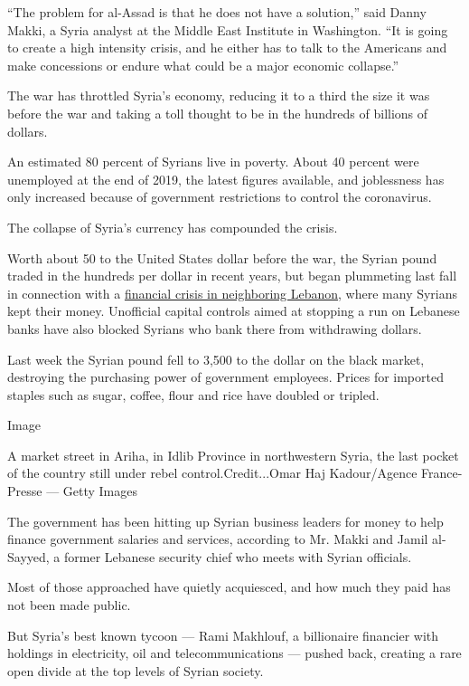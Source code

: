 ``The problem for al-Assad is that he does not have a solution,'' said
Danny Makki, a Syria analyst at the Middle East Institute in Washington.
``It is going to create a high intensity crisis, and he either has to
talk to the Americans and make concessions or endure what could be a
major economic collapse.''

The war has throttled Syria's economy, reducing it to a third the size
it was before the war and taking a toll thought to be in the hundreds of
billions of dollars.

An estimated 80 percent of Syrians live in poverty. About 40 percent
were unemployed at the end of 2019, the latest figures available, and
joblessness has only increased because of government restrictions to
control the coronavirus.

The collapse of Syria's currency has compounded the crisis.

Worth about 50 to the United States dollar before the war, the Syrian
pound traded in the hundreds per dollar in recent years, but began
plummeting last fall in connection with a
\href{https://www.nytimes3xbfgragh.onion/2020/05/10/world/middleeast/lebanon-economic-crisis.html}{financial
crisis in neighboring Lebanon}, where many Syrians kept their money.
Unofficial capital controls aimed at stopping a run on Lebanese banks
have also blocked Syrians who bank there from withdrawing dollars.

Last week the Syrian pound fell to 3,500 to the dollar on the black
market, destroying the purchasing power of government employees. Prices
for imported staples such as sugar, coffee, flour and rice have doubled
or tripled.

Image

A market street in Ariha, in Idlib Province in northwestern Syria, the
last pocket of the country still under rebel control.Credit...Omar Haj
Kadour/Agence France-Presse --- Getty Images

The government has been hitting up Syrian business leaders for money to
help finance government salaries and services, according to Mr. Makki
and Jamil al-Sayyed, a former Lebanese security chief who meets with
Syrian officials.

Most of those approached have quietly acquiesced, and how much they paid
has not been made public.

But Syria's best known tycoon --- Rami Makhlouf, a billionaire financier
with holdings in electricity, oil and telecommunications --- pushed
back, creating a rare open divide at the top levels of Syrian society.

